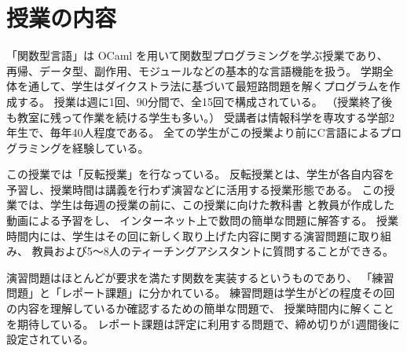 \section{授業の内容}
\label{section:experiment__course}
「関数型言語」は OCaml を用いて関数型プログラミングを学ぶ授業であり、
再帰、データ型、副作用、モジュールなどの基本的な言語機能を扱う。
学期全体を通して、学生はダイクストラ法に基づいて最短路問題を解くプログラムを作成する。
授業は週に1回、90分間で、全15回で構成されている。
（授業終了後も教室に残って作業を続ける学生も多い。）
受講者は情報科学を専攻する学部2年生で、毎年40人程度である。
全ての学生がこの授業より前にC言語によるプログラミングを経験している。

この授業では「反転授業」を行なっている。
反転授業とは、学生が各自内容を予習し、授業時間は講義を行わず演習などに活用する授業形態である。
この授業では、学生は毎週の授業の前に、この授業に向けた教科書 \cite{Asai07} と教員が作成した動画による予習をし、
インターネット上で数問の簡単な問題に解答する。
授業時間内には、学生はその回に新しく取り上げた内容に関する演習問題に取り組み、
教員および5〜8人のティーチングアシスタントに質問することができる。

演習問題はほとんどが要求を満たす関数を実装するというものであり、
「練習問題」と「レポート課題」に分かれている。
練習問題は学生がどの程度その回の内容を理解しているか確認するための簡単な問題で、
授業時間内に解くことを期待している。
レポート課題は評定に利用する問題で、締め切りが1週間後に設定されている。

